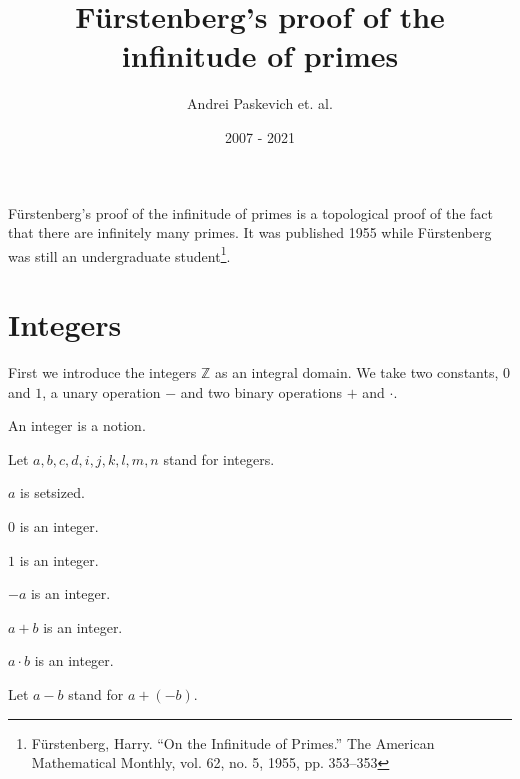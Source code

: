 \documentclass{article}
\title{Fürstenberg's proof of the infinitude of primes}
\author{Andrei Paskevich et. al.}
\date{2007 - 2021}
\newcommand{\Int}{\mathbb{Z}}
\begin{document}
  \maketitle

  Fürstenberg's proof of the infinitude of primes is a topological proof of the fact that there are infinitely many primes. It was published 1955 while Fürstenberg was still an undergraduate student\footnote{Fürstenberg, Harry. “On the Infinitude of Primes.” The American Mathematical Monthly, vol. 62, no. 5, 1955, pp. 353–353}.

  \section{Integers}

  First we introduce the integers $\Int$ as an integral domain. We take two constants, $0$ and $1$, a unary operation $-$ and two binary operations $+$ and $\cdot$.

  \begin{forthel}

    \begin{signature}[Integers]
      An integer is a notion.
    \end{signature}

    Let $a,b,c,d,i,j,k,l,m,n$ stand for integers.

    \begin{axiom}
      $a$ is setsized.
    \end{axiom}

    \begin{signature}[IntZero]
      $0$ is an integer.
    \end{signature}

    \begin{signature}[IntOne]
      $1$ is an integer.
    \end{signature}

    \begin{signature}[IntNeg]
      $-a$ is an integer.
    \end{signature}

    \begin{signature}[IntPlus]
      $a + b$ is an integer.
    \end{signature}

    \begin{signature}[IntMult]
      $a \cdot b$ is an integer.
    \end{signature}

    Let $a - b$ stand for $a + (-b)$.
  \end{forthel}
\end{document}
